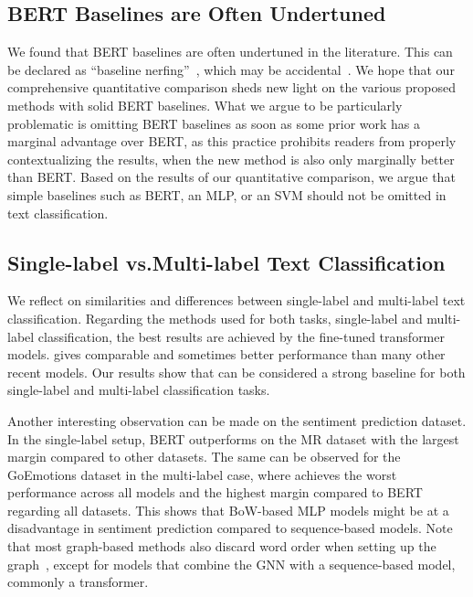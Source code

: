 \subsection{BERT Baselines are Often Undertuned}

We found that BERT baselines are often undertuned in the literature. This can be declared as ``baseline nerfing''~, which may be accidental~\cite{leech2024questionablepracticesmachinelearning}. 
We hope that our comprehensive quantitative comparison sheds new light on the various proposed methods with solid BERT baselines. What we argue to be particularly problematic is omitting BERT baselines as soon as some prior work has a marginal advantage over BERT, as this practice prohibits readers from properly contextualizing the results, \eg when the new method is also only marginally better than BERT. Based on the results of our quantitative comparison, we argue that simple baselines such as BERT, an MLP, or an SVM should not be omitted in text classification.

\subsection{Single-label vs.\@ Multi-label Text Classification}

We reflect on similarities and differences between single-label and multi-label text classification.
Regarding the methods used for both tasks, \ie single-label and multi-label classification, the best results are achieved by the fine-tuned transformer models.
\mlp gives comparable and sometimes better performance than many other recent models. Our results show that \mlp can be considered a strong baseline for both single-label and multi-label classification tasks.

Another interesting observation can be made on the sentiment prediction dataset. 
In the single-label setup, BERT outperforms \mlp on the MR dataset with the largest margin compared to other datasets. 
The same can be observed for the GoEmotions dataset in the multi-label case, where \mlp achieves the worst performance across all models and the highest margin compared to BERT regarding all datasets. 
This shows that BoW-based MLP models might be at a disadvantage in sentiment prediction compared to sequence-based models.
Note that most graph-based methods also discard word order when setting up the graph~\cite{galkescherp-acl2022}, except for models that combine the GNN with a sequence-based model, \ie commonly a transformer. 

